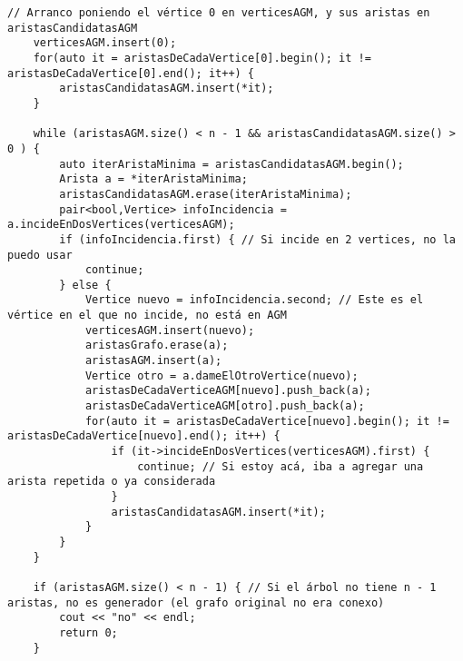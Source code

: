 \begin{lstlisting}[frame=single]
    // Arranco poniendo el vértice 0 en verticesAGM, y sus aristas en aristasCandidatasAGM
    verticesAGM.insert(0);
    for(auto it = aristasDeCadaVertice[0].begin(); it != aristasDeCadaVertice[0].end(); it++) {
        aristasCandidatasAGM.insert(*it);
    }
    
    while (aristasAGM.size() < n - 1 && aristasCandidatasAGM.size() > 0 ) {
        auto iterAristaMinima = aristasCandidatasAGM.begin();
        Arista a = *iterAristaMinima;
        aristasCandidatasAGM.erase(iterAristaMinima);
        pair<bool,Vertice> infoIncidencia = a.incideEnDosVertices(verticesAGM);
        if (infoIncidencia.first) { // Si incide en 2 vertices, no la puedo usar
            continue;
        } else {
            Vertice nuevo = infoIncidencia.second; // Este es el vértice en el que no incide, no está en AGM
            verticesAGM.insert(nuevo); 
            aristasGrafo.erase(a);
            aristasAGM.insert(a); 
            Vertice otro = a.dameElOtroVertice(nuevo);
            aristasDeCadaVerticeAGM[nuevo].push_back(a); 
            aristasDeCadaVerticeAGM[otro].push_back(a);
            for(auto it = aristasDeCadaVertice[nuevo].begin(); it != aristasDeCadaVertice[nuevo].end(); it++) {
                if (it->incideEnDosVertices(verticesAGM).first) {
                    continue; // Si estoy acá, iba a agregar una arista repetida o ya considerada
                }
                aristasCandidatasAGM.insert(*it);
            }
        }
    }
    
    if (aristasAGM.size() < n - 1) { // Si el árbol no tiene n - 1 aristas, no es generador (el grafo original no era conexo)
        cout << "no" << endl;
        return 0;
    }
    

\end{lstlisting}
